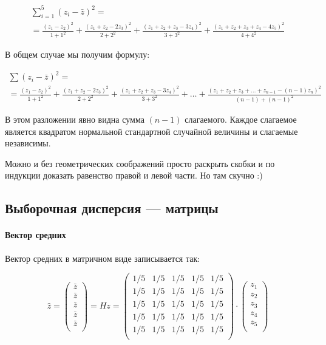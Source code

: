 \documentclass[11pt,russian,]{article}
\let\oldparagraph\paragraph
\renewcommand{\paragraph}[1]{\oldparagraph{#1}\mbox{}}
\newcommand{\1}{\mathbbm{1}}
\begin{document}
\begin{multline}
\nonumber
\sum_{i=1}^5 (z_i - \bar z)^2 = \\
= \frac{(z_1 - z_2)^2}{1+1^2} + \frac{(z_1 + z_2 - 2z_3)^2}{2+2^2} + \frac{(z_1 + z_2 + z_3 - 3z_4)^2}{3+3^2} + \frac{(z_1 + z_2 + z_3 + z_4 - 4z_5)^2}{4+4^2}
\end{multline}

В общем случае мы получим формулу:

\begin{multline}
\nonumber
\sum (z_i - \bar z)^2 = \\
= \frac{(z_1 - z_2)^2}{1+1^2} + \frac{(z_1 + z_2 - 2z_3)^2}{2+2^2} + \frac{(z_1 + z_2 + z_3 - 3z_4)^2}{3+3^2} + \ldots + \frac{(z_1 + z_2 + z_3 + \ldots + z_{n-1} - (n-1)z_n)^2}{(n-1)+(n-1)^2}
\end{multline}

В этом разложении явно видна сумма \((n-1)\) слагаемого. Каждое
слагаемое является квадратом нормальной стандартной случайной величины и
слагаемые независимы.

Можно и без геометрических соображений просто раскрыть скобки и по
индукции доказать равенство правой и левой части. Но там скучно :)

\subsection{Выборочная дисперсия --- матрицы}\label{--}

\paragraph{Вектор средних}\label{-}

Вектор средних в матричном виде записывается так:

\[
\hat z =
\begin{pmatrix}
\bar z \\
\bar z \\
\bar z \\
\bar z \\
\bar z \\
\end{pmatrix} = 
Hz=
\begin{pmatrix}
1/5 & 1/5 & 1/5 & 1/5 & 1/5 \\
1/5 & 1/5 & 1/5 & 1/5 & 1/5 \\
1/5 & 1/5 & 1/5 & 1/5 & 1/5 \\
1/5 & 1/5 & 1/5 & 1/5 & 1/5 \\
1/5 & 1/5 & 1/5 & 1/5 & 1/5 \\
\end{pmatrix} \cdot 
\begin{pmatrix}
z_1 \\
z_2 \\
z_3 \\
z_4 \\
z_5 \\
\end{pmatrix}
\]
\end{document}
